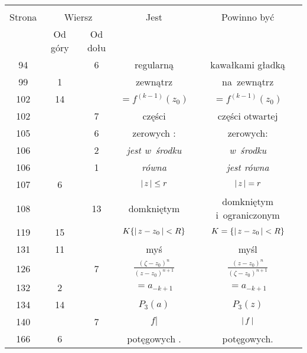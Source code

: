 \documentclass[a4paper,11pt]{article}
\begin{document}
\begin{center}
  \begin{tabular}{|c|c|c|c|c|}
    \hline
    & \multicolumn{2}{c|}{} & & \\
    Strona & \multicolumn{2}{c|}{Wiersz} & Jest
                              & Powinno być \\ \cline{2-3}
    & Od góry & Od dołu & & \\
    \hline
    94  & &  6 & regularną & kawałkami gładką \\
    99  &  1 & & zewnątrz & na~zewnątrz \\
    102 & 14 & & $=\!\! f^{ ( k - 1 ) }( z_{ 0 } )$
           & $= f^{ ( k - 1 ) }( z_{ 0 } )$ \\
    102 & &  7 & części & części otwartej \\
    105 & &  6 & zerowych : & zerowych: \\
    106 & &  2 & \emph{jest w~środku} & \emph{w~środku} \\
    106 & &  1 & \emph{równa} & \emph{jest równa} \\
    107 &  6 & & $\left| \,  z  \, \right| \leq r$ & $\left| \,  z  \, \right| = r$ \\
    108 & & 13 & domkniętym & domkniętym i~ograniczonym \\
    119 & 15 & & $K \{ \left| \,  z - z_{ 0 }  \, \right| < R \}$
           & $K = \{ \left| \,  z - z_{ 0 }  \, \right| < R \}$ \\
    131 & 11 & & myś & myśl \\
    126 & &  7 & $\frac{ ( \zeta - z_{ 0 } )^{ n } }{
                 ( z - z_{ 0 } )^{ n + 1 } }$
           & $\frac{ ( z - z_{ 0 } )^{ n } }{
             ( \zeta - z_{ 0 } )^{ n + 1 } }$ \\
    132 &  2 & & $=\!\! a_{ -k + 1 }$ & $= a_{ -k + 1 }$ \\
    134 & 14 & & $P_{ 3 }( a )$ & $P_{ 3 }( z )$ \\
    140 & &  7 & $f |$ & $\left| \,  f  \, \right|$ \\
    166 &  6 & & potęgowych . & potęgowych. \\
    \hline
  \end{tabular}
\end{center}
\end{document}

